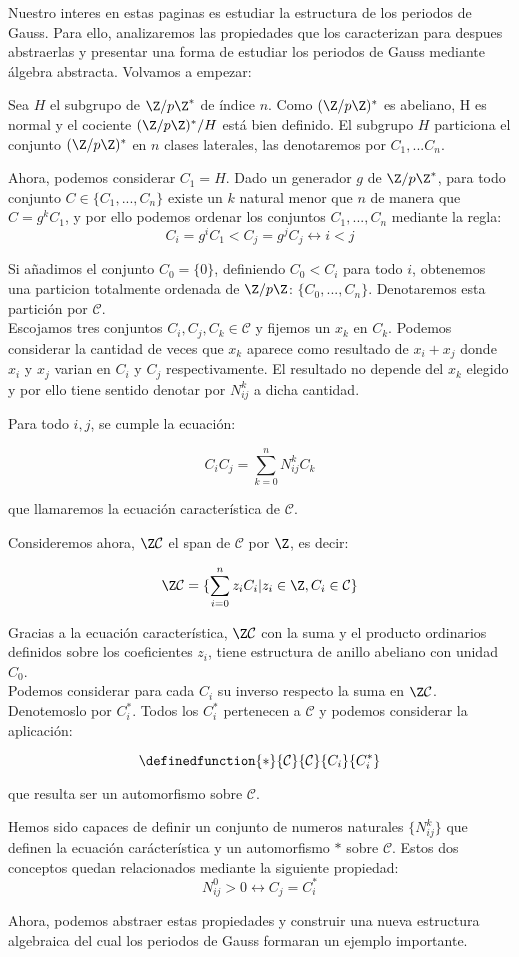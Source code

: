 \documentclass[a5paper]{article}
\renewcommand{\C}{\mathcal{C}}
\begin{document}
{
Nuestro interes en estas paginas es estudiar la estructura de los periodos de Gauss. Para ello, analizaremos las propiedades que los caracterizan para despues abstraerlas y presentar una forma de estudiar los periodos de Gauss mediante álgebra abstracta. Volvamos a empezar:

Sea $H$ el subgrupo de $\Z/p\Z^*$ de índice $n$. Como $(\Z/p\Z)^*$ es abeliano, H es normal y el cociente $(\Z/p\Z)^*/H$ está bien definido. El subgrupo $H$ particiona el conjunto $(\Z/p\Z)^*$ en $n$ clases laterales, las denotaremos por $C_1,...C_n$.

Ahora, podemos considerar $C_1 = H$. Dado un generador $g$ de $\Z/p\Z^*$, para todo conjunto $C \in \{C_1,...,C_n\}$ existe un $k$ natural menor que $n$ de manera que $C = g^kC_1$, y por ello podemos ordenar los conjuntos $C_1,...,C_n$ mediante la regla:
$$C_i = g^iC_1 < C_j = g^jC_j \leftrightarrow i < j$$

Si añadimos el conjunto $C_0 = \{0\}$, definiendo $C_0 < C_i$ para todo $i$, obtenemos una particion totalmente ordenada de $\Z/p\Z$: $\{C_0,...,C_n\}$. Denotaremos esta partición por $\C$.\\

Escojamos tres conjuntos $C_i,C_j,C_k \in \C$ y fijemos un $x_k$ en $C_k$. Podemos considerar la cantidad de veces que $x_k$ aparece como resultado de $x_i+x_j$ donde $x_i$ y $x_j$ varian en $ C_i $ y $ C_j $ respectivamente. El resultado no depende del $x_k$ elegido y por ello tiene sentido denotar por $N_{ij}^k$ a dicha cantidad.

Para todo $i,j$, se cumple la ecuación:

$$ C_iC_j = \sum_{k=0}^n N_{ij}^kC_k $$

que llamaremos la ecuación característica de $\C$.

\newpage

Consideremos ahora, $\Z\C$ el span de $\C$ por $\Z$, es decir:

$$ \Z\C = \{\sum_{i=0}^n z_iC_i | z_i \in \Z, C_i \in \C \} $$

Gracias a la ecuación característica, $\Z\C$ con la suma y el producto ordinarios definidos sobre los coeficientes $z_i$, tiene estructura de anillo abeliano con unidad $C_0$.\\
Podemos considerar para cada $C_i$ su inverso respecto la suma en $\Z\C$. Denotemoslo por $C_i^*$. Todos los $C_i^*$ pertenecen a $\C$ y podemos considerar la aplicación:

$$\definedfunction{ * }{ \C }{ \C }{ C_i }{ C_i^* }$$

que resulta ser un automorfismo sobre $\C$.

Hemos sido capaces de definir un conjunto de numeros naturales $\{N_{ij}^k\}$ que definen la ecuación carácterística y un automorfismo $*$ sobre $\C$. Estos dos conceptos quedan relacionados mediante la siguiente propiedad:
$$N_{ij}^0 > 0 \leftrightarrow C_j = C_i^*$$

Ahora, podemos abstraer estas propiedades y construir una nueva estructura algebraica del cual los periodos de Gauss formaran un ejemplo importante. 
}
\end{document}
